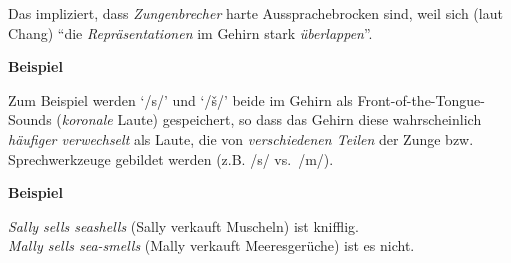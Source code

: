\documentclass[
  letterpaper,
]{scrbook}
\begin{document}
Das impliziert, dass \emph{Zungenbrecher} harte Aussprachebrocken sind,
weil sich (laut Chang) ``die \emph{Repräsentationen} im Gehirn stark
\emph{überlappen}''.

\begin{tcolorbox}[enhanced jigsaw, opacityback=0, colback=white, breakable, toprule=.15mm, rightrule=.15mm, bottomrule=.15mm, colframe=quarto-callout-note-color-frame, arc=.35mm, leftrule=.75mm, left=2mm]
\begin{minipage}[t]{5.5mm}
\textcolor{quarto-callout-note-color}{\faInfo}
\end{minipage}%
\begin{minipage}[t]{\textwidth - 5.5mm}

\textbf{Beispiel}\vspace{2mm}

Zum Beispiel werden `/s/' und `/š/' beide im Gehirn als
Front-of-the-Tongue-Sounds (\emph{koronale} Laute) gespeichert, so dass
das Gehirn diese wahrscheinlich \emph{häufiger verwechselt} als Laute,
die von \emph{verschiedenen Teilen} der Zunge bzw. Sprechwerkzeuge
gebildet werden (z.B. /s/ vs.~/m/).

\end{minipage}%
\end{tcolorbox}

\begin{tcolorbox}[enhanced jigsaw, opacityback=0, colback=white, breakable, toprule=.15mm, rightrule=.15mm, bottomrule=.15mm, colframe=quarto-callout-note-color-frame, arc=.35mm, leftrule=.75mm, left=2mm]
\begin{minipage}[t]{5.5mm}
\textcolor{quarto-callout-note-color}{\faInfo}
\end{minipage}%
\begin{minipage}[t]{\textwidth - 5.5mm}

\textbf{Beispiel}\vspace{2mm}

\emph{Sally sells seashells} (Sally verkauft Muscheln) ist knifflig.\\
\emph{Mally sells sea-smells} (Mally verkauft Meeresgerüche) ist es
nicht.

\end{minipage}%
\end{tcolorbox}
\end{document}
